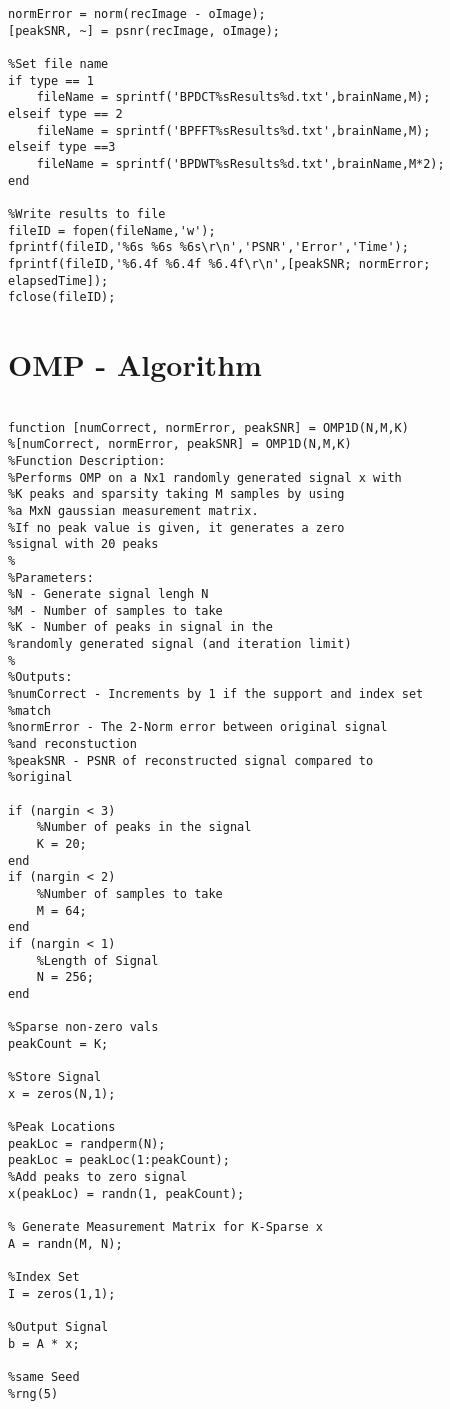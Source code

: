 \documentclass[titlepage,oneside, 12pt]{book}
\theoremstyle{break}
\begin{document}
\begin{appendices}
\begin{lstlisting}[label={lst:ex1DMRI}]
normError = norm(recImage - oImage);
[peakSNR, ~] = psnr(recImage, oImage);

%Set file name
if type == 1
    fileName = sprintf('BPDCT%sResults%d.txt',brainName,M);
elseif type == 2
    fileName = sprintf('BPFFT%sResults%d.txt',brainName,M);
elseif type ==3
    fileName = sprintf('BPDWT%sResults%d.txt',brainName,M*2);
end
    
%Write results to file
fileID = fopen(fileName,'w');
fprintf(fileID,'%6s %6s %6s\r\n','PSNR','Error','Time');
fprintf(fileID,'%6.4f %6.4f %6.4f\r\n',[peakSNR; normError; elapsedTime]);
fclose(fileID);

\end{lstlisting}

\chapter{OMP - Algorithm}
\begin{lstlisting}

function [numCorrect, normError, peakSNR] = OMP1D(N,M,K)
%[numCorrect, normError, peakSNR] = OMP1D(N,M,K)
%Function Description: 
%Performs OMP on a Nx1 randomly generated signal x with 
%K peaks and sparsity taking M samples by using 
%a MxN gaussian measurement matrix. 
%If no peak value is given, it generates a zero 
%signal with 20 peaks
%
%Parameters:
%N - Generate signal lengh N
%M - Number of samples to take
%K - Number of peaks in signal in the 
%randomly generated signal (and iteration limit)
%
%Outputs:
%numCorrect - Increments by 1 if the support and index set
%match
%normError - The 2-Norm error between original signal 
%and reconstuction
%peakSNR - PSNR of reconstructed signal compared to
%original

if (nargin < 3)
    %Number of peaks in the signal 
    K = 20;
end
if (nargin < 2)
    %Number of samples to take
    M = 64;
end
if (nargin < 1)
    %Length of Signal 
    N = 256;
end

%Sparse non-zero vals
peakCount = K; 

%Store Signal
x = zeros(N,1);

%Peak Locations
peakLoc = randperm(N);
peakLoc = peakLoc(1:peakCount); 
%Add peaks to zero signal
x(peakLoc) = randn(1, peakCount);

% Generate Measurement Matrix for K-Sparse x
A = randn(M, N);

%Index Set
I = zeros(1,1);

%Output Signal
b = A * x;

%same Seed
%rng(5)


\end{lstlisting}
\end{appendices}
\end{document}
